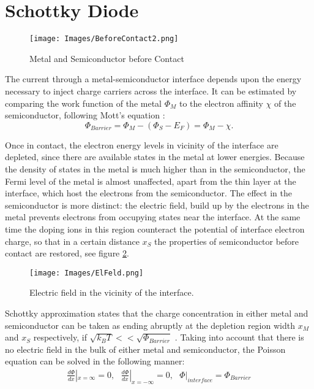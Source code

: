 \documentclass[12pt]{article}
\begin{document}
	
\section{Schottky Diode}
	\label{sec:Schottky}

\begin{figure}[htb]
	\centering
		\texttt{[image: Images/BeforeContact2.png]}
	\caption{Metal and Semiconductor before Contact}
	\label{fig:BeforeContact}
\end{figure}

	The current through a metal-semiconductor interface depends upon the energy necessary to inject charge carriers across the interface.
It can be estimated by comparing the work function of the metal $\Phi _M$ to the electron affinity $\chi$ of the semiconductor, following Mott's equation \cite{Fundamentals}:
\begin{equation}
	\Phi _{Barrier} = \Phi _M - (\Phi _S - E_F) = \Phi _M - \chi.
\end{equation}

Once in contact, the electron energy levels in vicinity of the interface are depleted, since there are available states in the metal at lower energies. Because the density of states in the metal is much higher than in the semiconductor, the Fermi level of the metal is almost unaffected, apart from the thin layer at the interface, which host the electrons from the semiconductor. The effect in the semiconductor is more distinct: the electric field, build up by the electrons in the metal prevents electrons from occupying states near the interface. At the same time the doping ions in this region counteract the potential of interface electron charge, so that in a certain distance $x_S$ the properties of semiconductor before contact are restored, see figure \ref{fig:ElFeld}. 

\begin{figure}[hb]
	\centering
		\texttt{[image: Images/ElFeld.png]}
	\caption{Electric field in the vicinity of the interface.}
	\label{fig:ElFeld}
\end{figure}

Schottky approximation states that the charge concentration in either metal and semiconductor can be taken as ending abruptly at the depletion region width $x_M$ and $x_S$ respectively, if \( \sqrt{k_B T} << \sqrt{\Phi_{Barrier}} \) \cite{Fundamentals}. Taking into account that there is no electric field in the bulk of either metal and semiconductor, the Poisson equation can be solved in the following manner:
\begin{align*}
\frac{d \Phi}{dx} | _{x = \infty} = 0, \ \ \
\frac{d \Phi}{dx} | _{x = -\infty} = 0, \ \ \
\Phi |_{interface} = \Phi_{Barrier}
\end{align*}
\end{document}
